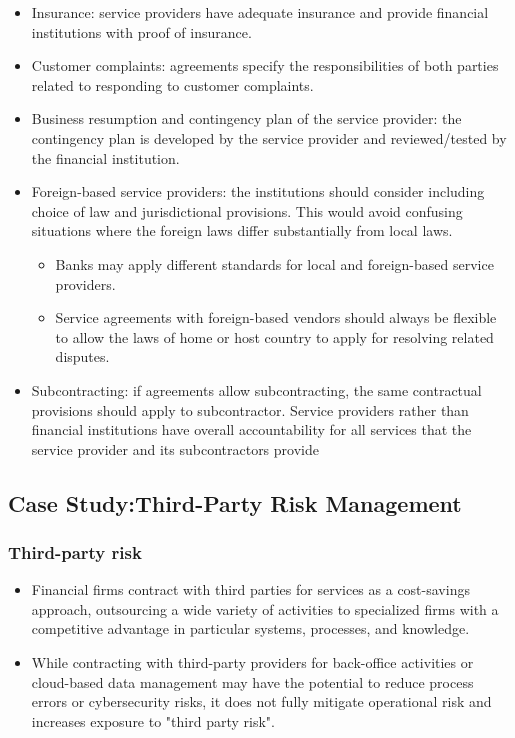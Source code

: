 \begin{itemize}
\begin{itemize}
    \item Insurance: service providers have adequate insurance and provide financial institutions with proof of insurance.
    \item  Customer complaints: agreements specify the responsibilities of both parties related to responding to customer complaints.
    \item  Business resumption and contingency plan of the service provider: the contingency plan is developed by the service provider and reviewed/tested by the financial institution.
    \item Foreign-based service providers: the institutions should consider including choice of law and jurisdictional provisions. This would avoid confusing situations where the foreign laws differ substantially from local laws.
        \begin{itemize}
        \item Banks may apply different standards for local and foreign-based service providers.
        \item Service agreements with foreign-based vendors should always be flexible to allow the laws of home or host country to apply for resolving related disputes. 
        \end{itemize}
    \item Subcontracting: if agreements allow subcontracting, the same contractual provisions should apply to subcontractor. Service providers rather than financial institutions have overall accountability for all services that the service provider and its subcontractors provide
    \end{itemize}
\end{itemize}









\subsection{ Case Study:Third-Party Risk Management}






\subsubsection{Third-party risk}
\begin{itemize}
\item Financial firms contract with third parties for services as a cost-savings approach, outsourcing a wide variety of activities to specialized firms with a competitive advantage in particular systems, processes, and knowledge.
\item While contracting with third-party providers for back-office activities or cloud-based data management may have the potential to reduce process errors or cybersecurity risks, it does not fully mitigate operational risk and increases exposure to "third party risk".
\end{itemize}



